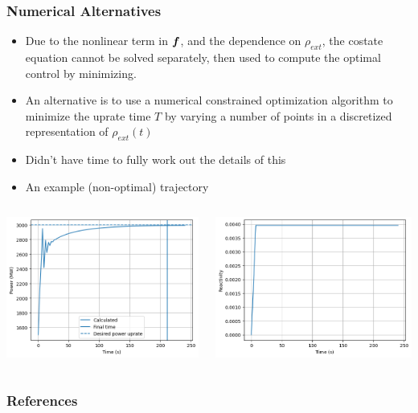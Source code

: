 \documentclass[10pt,compress]{beamer}
\begin{document}
\begin{frame}\frametitle{Numerical Alternatives}
    \begin{itemize}
        \item Due to the nonlinear term in $\boldsymbol{f}$, and the dependence on $\rho_{ext}$, the costate equation cannot be solved
        separately, then used to compute the optimal control by minimizing.
        \item An alternative is to use a numerical constrained optimization algorithm to minimize the uprate time $T$ by varying
            a number of points in a discretized representation of $\rho_{ext}(t)$
        \item Didn't have time to fully work out the details of this
        \item An example (non-optimal) trajectory
    \end{itemize}
    \begin{columns}
        \begin{column}{5cm}
            \centering
            \includegraphics[width=0.9\linewidth]{images/power.png}
        \end{column}
        \begin{column}{5cm}
            \centering
            \includegraphics[width=0.9\linewidth]{images/ramp.png}
        \end{column}
    \end{columns}
\end{frame}

\begin{frame}\frametitle{References}
    \nocite{*}
    
\end{frame}
\end{document}
